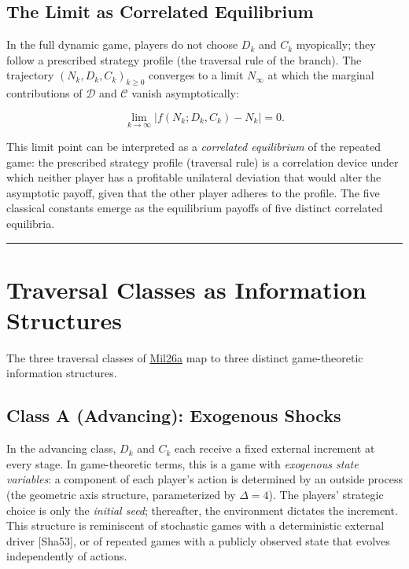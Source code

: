 \documentclass[12pt]{article}
\begin{document}
\subsection{The Limit as Correlated Equilibrium}\label{the-limit-as-correlated-equilibrium}

In the full dynamic game, players do not choose \(D_k\) and \(C_k\)
myopically; they follow a prescribed strategy profile (the traversal
rule of the branch). The trajectory \((N_k, D_k, C_k)_{k \geq 0}\)
converges to a limit \(N_\infty\) at which the marginal contributions of
\(\mathcal{D}\) and \(\mathcal{C}\) vanish asymptotically:

\[\lim_{k \to \infty} \bigl| f(N_k; D_k, C_k) - N_k \bigr| = 0.\]

This limit point can be interpreted as a \emph{correlated equilibrium}
of the repeated game: the prescribed strategy profile (traversal rule)
is a correlation device under which neither player has a profitable
unilateral deviation that would alter the asymptotic payoff, given that
the other player adheres to the profile. The five classical constants
emerge as the equilibrium payoffs of five distinct correlated
equilibria.

\begin{center}\rule{0.5\linewidth}{0.5pt}\end{center}

\section{Traversal Classes as Information Structures}\label{traversal-classes-as-information-structures}

The three traversal classes of
\href{https://github.com/baardev/truevalue/blob/main/docnav/Research/papers/1_recursive-tholonic-five-constants/1_recursive-tholonic-five-constants.pdf}{Mil26a}
map to three distinct game-theoretic information structures.

\subsection{Class A (Advancing): Exogenous Shocks}\label{class-a-advancing-exogenous-shocks}

In the advancing class, \(D_k\) and \(C_k\) each receive a fixed
external increment at every stage. In game-theoretic terms, this is a
game with \emph{exogenous state variables}: a component of each player's
action is determined by an outside process (the geometric axis
structure, parameterized by \(\Delta = 4\)). The players' strategic
choice is only the \emph{initial seed}; thereafter, the environment
dictates the increment. This structure is reminiscent of stochastic
games with a deterministic external driver {[}Sha53{]}, or of repeated
games with a publicly observed state that evolves independently of
actions.
\end{document}

